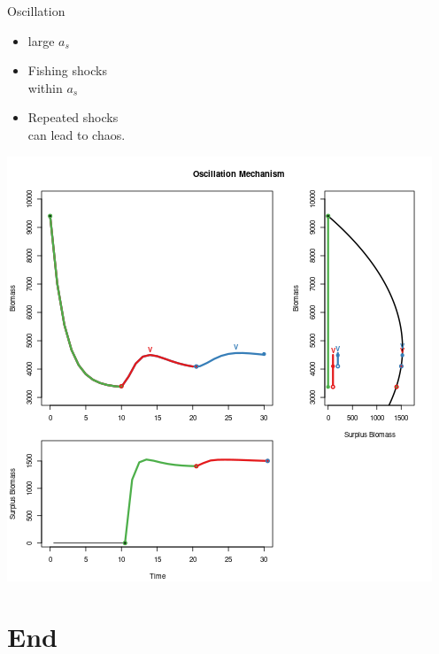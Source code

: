 \documentclass[ xcolor = pdftex, dvipsnames, table ]{beamer}
\begin{document}
%
\begin{frame}{Oscillation}
        \begin{minipage}[h!]{0.39\textwidth}
	\begin{itemize}
        \setlength\itemsep{1em}
	\item large $a_s$
	\item Fishing shocks \\within $a_s$
	\item Repeated shocks \\can lead to chaos.
	\end{itemize}
	\end{minipage}
        \begin{minipage}[h!]{0.59\textwidth}
	\includegraphics[width=\textwidth]{../../ddBias/shockBiomassSurplus.png}
	\end{minipage}
\end{frame}


%
\section{End}
\end{document}
